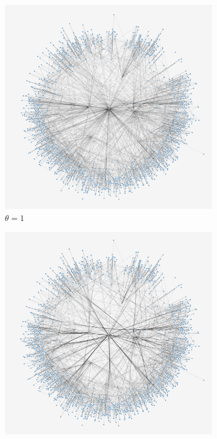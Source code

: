\begin{figure}[H]
     \centering
      \begin{subfigure}[b]{.49\textwidth}
         \centering
     \includegraphics[width=\textwidth]{figures_c1/layout/merc1.png} \caption{$\theta = 1$}
     \end{subfigure}
\begin{subfigure}[b]{.49\textwidth}
         \centering
     \includegraphics[width=\textwidth]{figures_c1/layout/merc2.png}

\end{subfigure}
\end{figure}
